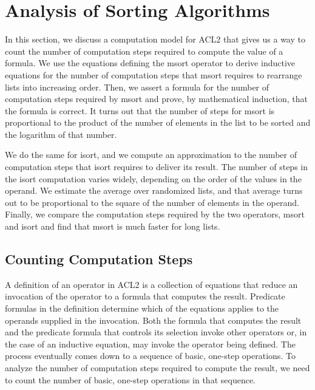 \section{Analysis of Sorting Algorithms}
\label{sec:sort-analysis}

In this section, we discuss a computation model for ACL2
that gives us a way to count the number of computation steps required
to compute the value of a formula. We use the equations defining
the msort operator to derive inductive equations
for the number of computation steps that msort requires to rearrange lists
into increasing order.
Then, we assert a formula for the number of computation steps required
by msort and prove, by mathematical induction,
that the formula is correct.
It turns out that the number of steps for msort
is proportional to the product of
the number of elements in the list to be sorted
and the logarithm of that number.

We do the same for isort, and
we compute an approximation to the number of computation steps
that isort requires to deliver its result.
The number of steps in the isort computation varies widely,
depending on the order of the values in the operand.
We estimate the average over randomized lists,
and that average turns out to be proportional
to the square of the number of elements in the operand.
Finally, we compare the computation steps required by
the two operators, msort and isort and find that
msort is much faster for long lists.

\subsection{Counting Computation Steps}
\label{subsec:counting-computation-steps}

A definition of an operator in ACL2
is a collection of equations that
reduce an invocation of the operator
to a formula that computes the result.
Predicate formulas in the definition determine
which of the equations applies to
the operands supplied in the invocation.
Both the formula that computes the result and
the predicate formula that controls
its selection invoke other operators
or, in the case of an inductive equation,
may invoke the operator being defined.
The process eventually comes down to a sequence
of basic, one-step operations.
To analyze the number of computation steps
required to compute the result,
we need to count the number of basic, one-step operations
in that sequence.

